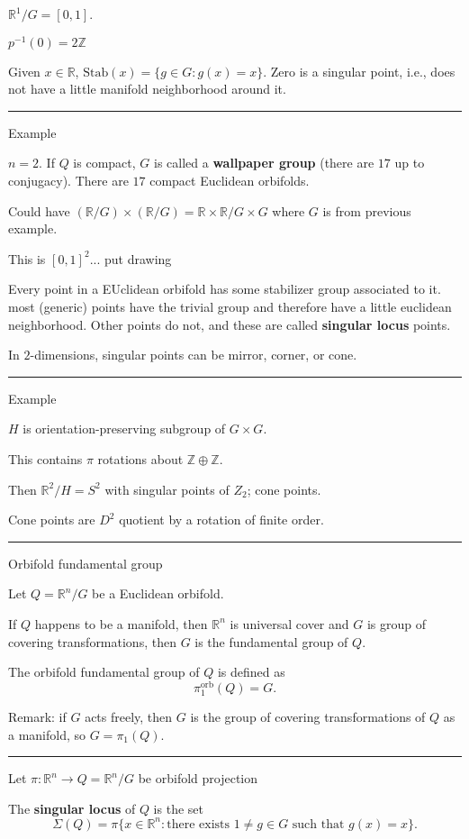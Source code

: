 \documentclass[12pt]{article}
\newcommand{\keyword}[1]{\textbf{#1}}
\newcommand{\sepline}{\rule{\textwidth}{0.4pt}}
\theoremstyle{definition}
\newcommand{\Z}{\mathbb{Z}}
\newcommand{\R}{\mathbb{R}}
\newcommand{\<}{\left\langle}
\renewcommand{\>}{\right\rangle}
\newcommand{\Stab}{\mathrm{Stab}}
\begin{document}
$\R^1/G = [0, 1]$.

$p^{-1}(0) = 2\Z$

Given $x \in \R$, $\Stab(x) = \{g \in G : g(x) = x\}$.
Zero is a singular point, i.e., does not have a little manifold neighborhood around it.

\sepline

Example

$n = 2$.
If $Q$ is compact, $G$ is called a \keyword{wallpaper group} (there are $17$ up to conjugacy).
There are $17$ compact Euclidean orbifolds.

Could have $(\R/G) \times (\R/G) = \R \times \R / G \times G$ where $G$ is from previous example.

This is $[0, 1]^2$... put drawing

Every point in a EUclidean orbifold has some stabilizer group associated to it. most (generic) points have the trivial group and therefore have a little euclidean neighborhood.
Other points do not, and these are called \keyword{singular locus} points.

In $2$-dimensions, singular points can be mirror, corner, or cone.

\sepline

Example

$H$ is orientation-preserving subgroup of $G \times G$.

This contains $\pi$ rotations about $\Z \oplus \Z$.

Then $\R^2/H = S^2$ with singular points of $Z_2$; cone points.

Cone points are $D^2$ quotient by a rotation of finite order.

\sepline

Orbifold fundamental group

Let $Q = \R^n/G$ be a Euclidean orbifold.

If $Q$ happens to be a manifold, then $\R^n$ is universal cover and $G$ is group of covering transformations, then $G$ is the fundamental group of $Q$.

The orbifold fundamental group of $Q$ is defined as
\[
    \pi^{\mathrm{orb}}_1(Q) = G.
\]

Remark: if $G$ acts freely, then $G$ is the group of covering transformations of $Q$ as a manifold, so $G = \pi_1(Q)$.

\sepline

Let $\pi : \R^n \to Q = \R^n/G$ be orbifold projection

The \keyword{singular locus} of $Q$ is the set
\[
    \Sigma(Q) = \pi\{x \in \R^n : \text{there exists } 1 \ne g \in G \text{ such that } g(x) = x\}.
\]
\end{document}
